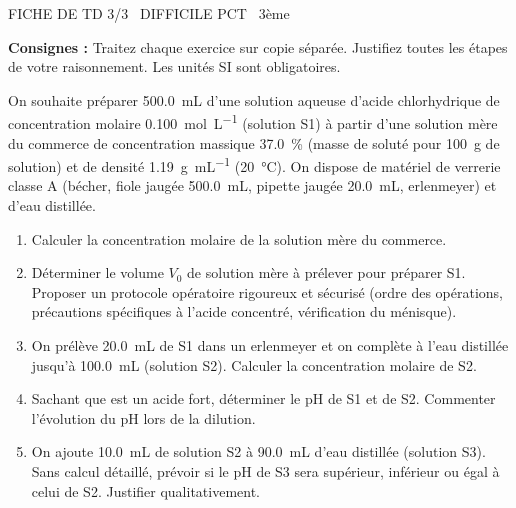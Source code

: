 \documentclass[11pt]{article}
\begin{document}
\begin{tcolorbox}[enhanced,colback=popink,colframe=popink,arc=10pt,boxrule=0pt,left=12pt,right=12pt,top=9pt,bottom=9pt]
{\color{white}\popxbold\small FICHE DE TD 3/3 \textbullet\ DIFFICILE \hfill PCT \textbullet\ 3ème\par}
\end{tcolorbox}
\vspace{4pt}
\noindent \textbf{Consignes :} Traitez chaque exercice sur copie séparée. Justifiez toutes les étapes de votre raisonnement. Les unités SI sont obligatoires.

\begin{exercice}
On souhaite préparer \SI{500,0}{mL} d'une solution aqueuse d'acide chlorhydrique  de concentration molaire \SI{0,100}{mol.L^{-1}} (solution S1) à partir d'une solution mère  du commerce de concentration massique \SI{37,0}{\%} (masse de soluté pour \SI{100}{g} de solution) et de densité \SI{1,19}{g.mL^{-1}} (\SI{20}{\celsius}). 
On dispose de matériel de verrerie classe A (bécher, fiole jaugée \SI{500,0}{mL}, pipette jaugée \SI{20,0}{mL}, erlenmeyer) et d'eau distillée.
\begin{enumerate}
    \item Calculer la concentration molaire de la solution mère du commerce. 
    \item Déterminer le volume $V_0$ de solution mère à prélever pour préparer S1. Proposer un protocole opératoire rigoureux et sécurisé (ordre des opérations, précautions spécifiques à l'acide concentré, vérification du ménisque).
    \item On prélève \SI{20,0}{mL} de S1 dans un erlenmeyer et on complète à l'eau distillée jusqu'à \SI{100,0}{mL} (solution S2). Calculer la concentration molaire de S2.
    \item Sachant que  est un acide fort, déterminer le pH de S1 et de S2. Commenter l'évolution du pH lors de la dilution.
    \item On ajoute \SI{10,0}{mL} de solution S2 à \SI{90,0}{mL} d'eau distillée (solution S3). Sans calcul détaillé, prévoir si le pH de S3 sera supérieur, inférieur ou égal à celui de S2. Justifier qualitativement.
\end{enumerate}
\end{exercice}
\end{document}
